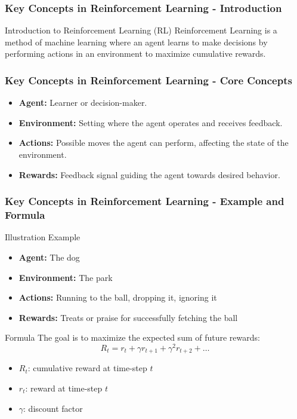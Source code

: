 \documentclass[aspectratio=169]{beamer}
\begin{document}
\begin{frame}[fragile]
  \frametitle{Key Concepts in Reinforcement Learning - Introduction}
  \begin{block}{Introduction to Reinforcement Learning (RL)}
    Reinforcement Learning is a method of machine learning where an agent learns to make decisions by performing actions in an environment to maximize cumulative rewards. 
  \end{block}
\end{frame}

\begin{frame}[fragile]
  \frametitle{Key Concepts in Reinforcement Learning - Core Concepts}
  \begin{itemize}
    \item \textbf{Agent:} Learner or decision-maker.
    \item \textbf{Environment:} Setting where the agent operates and receives feedback.
    \item \textbf{Actions:} Possible moves the agent can perform, affecting the state of the environment.
    \item \textbf{Rewards:} Feedback signal guiding the agent towards desired behavior.
  \end{itemize}
\end{frame}

\begin{frame}[fragile]
  \frametitle{Key Concepts in Reinforcement Learning - Example and Formula}
  \begin{block}{Illustration Example}
    \begin{itemize}
      \item \textbf{Agent:} The dog
      \item \textbf{Environment:} The park
      \item \textbf{Actions:} Running to the ball, dropping it, ignoring it
      \item \textbf{Rewards:} Treats or praise for successfully fetching the ball
    \end{itemize}
  \end{block}

  \begin{block}{Formula}
    The goal is to maximize the expected sum of future rewards:
    \begin{equation}
      R_t = r_t + \gamma r_{t+1} + \gamma^2 r_{t+2} + \dots
    \end{equation}
    \begin{itemize}
      \item \( R_t \): cumulative reward at time-step \( t \)
      \item \( r_t \): reward at time-step \( t \)
      \item \( \gamma \): discount factor
    \end{itemize}
  \end{block}
\end{frame}
\end{document}
